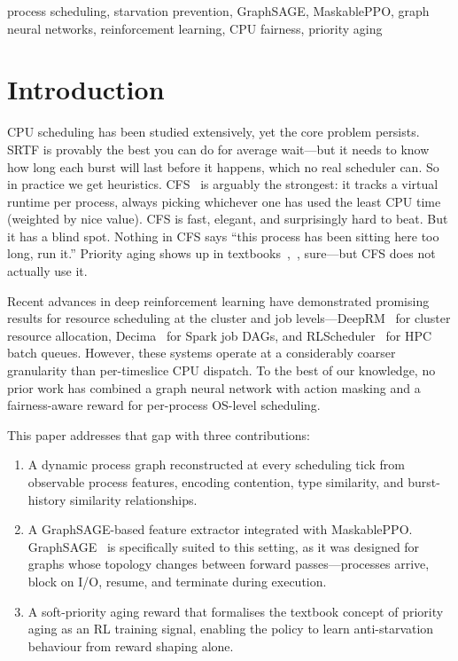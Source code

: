 \documentclass[conference]{IEEEtran}
\begin{document}
\begin{IEEEkeywords}
process scheduling, starvation prevention, GraphSAGE, MaskablePPO,
graph neural networks, reinforcement learning, CPU fairness, priority aging
\end{IEEEkeywords}

\section{Introduction}

CPU scheduling has been studied extensively, yet the core problem persists.
SRTF is provably the best you can do for average wait---but it needs to
know how long each burst will last before it happens, which no real
scheduler can. So in practice we get heuristics. CFS~\cite{molnar2007cfs}
is arguably the strongest: it tracks a virtual runtime per process, always
picking whichever one has used the least CPU time (weighted by nice value).
CFS is fast, elegant, and surprisingly hard to beat. But it has a blind
spot. Nothing in CFS says ``this process has been sitting here too long, run
it.'' Priority aging shows up in
textbooks~\cite{arpaci2023ostep},~\cite{silberschatz2018os}, sure---but CFS
does not actually use it.

Recent advances in deep reinforcement learning have demonstrated promising
results for resource scheduling at the cluster and job
levels---DeepRM~\cite{mao2016deeprm} for cluster resource allocation,
Decima~\cite{mao2019decima} for Spark job DAGs, and
RLScheduler~\cite{zhang2020rlscheduler} for HPC batch queues. However, these
systems operate at a considerably coarser granularity than per-timeslice CPU
dispatch. To the best of our knowledge, no prior work has combined a graph
neural network with action masking and a fairness-aware reward for
per-process OS-level scheduling.

This paper addresses that gap with three contributions:
\begin{enumerate}
\item A dynamic process graph reconstructed at every scheduling tick from
observable process features, encoding contention, type similarity, and
burst-history similarity relationships.
\item A GraphSAGE-based feature extractor integrated with MaskablePPO.
GraphSAGE~\cite{hamilton2017graphsage} is specifically suited to this
setting, as it was designed for graphs whose topology changes between
forward passes---processes arrive, block on I/O, resume, and terminate
during execution.
\item A soft-priority aging reward that formalises the textbook concept of
priority aging as an RL training signal, enabling the policy to learn
anti-starvation behaviour from reward shaping alone.
\end{enumerate}
\end{document}
